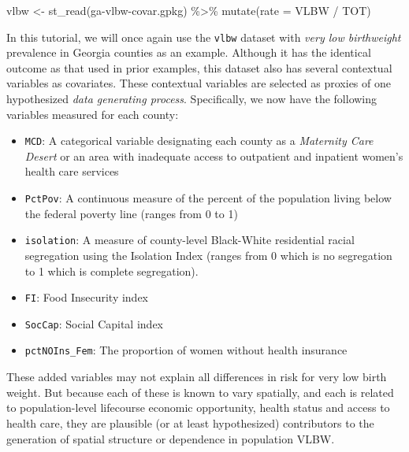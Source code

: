 \documentclass[
]{book}
\newenvironment{Shaded}{\begin{snugshade}}{\end{snugshade}}
\newcommand{\AttributeTok}[1]{\textcolor[rgb]{0.77,0.63,0.00}{#1}}
\newcommand{\FunctionTok}[1]{\textcolor[rgb]{0.00,0.00,0.00}{#1}}
\newcommand{\NormalTok}[1]{#1}
\newcommand{\OtherTok}[1]{\textcolor[rgb]{0.56,0.35,0.01}{#1}}
\newcommand{\SpecialCharTok}[1]{\textcolor[rgb]{0.00,0.00,0.00}{#1}}
\newcommand{\StringTok}[1]{\textcolor[rgb]{0.31,0.60,0.02}{#1}}
\providecommand{\tightlist}{%
  \setlength{\itemsep}{0pt}\setlength{\parskip}{0pt}}
\begin{document}
\begin{Shaded}
\begin{Highlighting}[]
\NormalTok{vlbw }\OtherTok{\textless{}{-}} \FunctionTok{st\_read}\NormalTok{(}\StringTok{\textquotesingle{}ga{-}vlbw{-}covar.gpkg\textquotesingle{}}\NormalTok{)  }\SpecialCharTok{\%\textgreater{}\%}
  \FunctionTok{mutate}\NormalTok{(}\AttributeTok{rate =}\NormalTok{ VLBW }\SpecialCharTok{/}\NormalTok{ TOT)}
\end{Highlighting}
\end{Shaded}

In this tutorial, we will once again use the \texttt{vlbw} dataset with \emph{very low birthweight} prevalence in Georgia counties as an example. Although it has the identical outcome as that used in prior examples, this dataset also has several contextual variables as covariates. These contextual variables are selected as proxies of one hypothesized \emph{data generating process}. Specifically, we now have the following variables measured for each county:

\begin{itemize}
\tightlist
\item
  \texttt{MCD}: A categorical variable designating each county as a \emph{Maternity Care Desert} or an area with inadequate access to outpatient and inpatient women's health care services
\item
  \texttt{PctPov}: A continuous measure of the percent of the population living below the federal poverty line (ranges from 0 to 1)
\item
  \texttt{isolation}: A measure of county-level Black-White residential racial segregation using the Isolation Index (ranges from 0 which is no segregation to 1 which is complete segregation).
\item
  \texttt{FI}: Food Insecurity index
\item
  \texttt{SocCap}: Social Capital index
\item
  \texttt{pctNOIns\_Fem}: The proportion of women without health insurance
\end{itemize}

These added variables may not explain all differences in risk for very low birth weight. But because each of these is known to vary spatially, and each is related to population-level lifecourse economic opportunity, health status and access to health care, they are plausible (or at least hypothesized) contributors to the generation of spatial structure or dependence in population VLBW.
\end{document}
